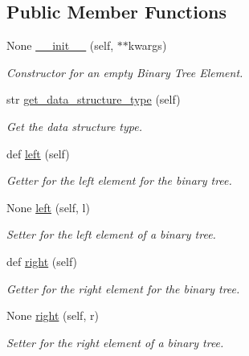 \subsection*{Public Member Functions}
\begin{DoxyCompactItemize}
\item 
None \mbox{\hyperlink{classbridges_1_1bin__tree__element_1_1_bin_tree_element_a4c50812c9a43aa5cd75ccc46b818a8b2}{\+\_\+\+\_\+init\+\_\+\+\_\+}} (self, $\ast$$\ast$kwargs)
\begin{DoxyCompactList}\small\item\em Constructor for an empty Binary Tree Element. \end{DoxyCompactList}\item 
str \mbox{\hyperlink{classbridges_1_1bin__tree__element_1_1_bin_tree_element_a9238744e18486fb8882238394f5efe7c}{get\+\_\+data\+\_\+structure\+\_\+type}} (self)
\begin{DoxyCompactList}\small\item\em Get the data structure type. \end{DoxyCompactList}\item 
def \mbox{\hyperlink{classbridges_1_1bin__tree__element_1_1_bin_tree_element_adb99f8052ef772be4c280970e47e6e0d}{left}} (self)
\begin{DoxyCompactList}\small\item\em Getter for the left element for the binary tree. \end{DoxyCompactList}\item 
None \mbox{\hyperlink{classbridges_1_1bin__tree__element_1_1_bin_tree_element_a29dc5b117c65774e756b46de45cd2f20}{left}} (self, l)
\begin{DoxyCompactList}\small\item\em Setter for the left element of a binary tree. \end{DoxyCompactList}\item 
def \mbox{\hyperlink{classbridges_1_1bin__tree__element_1_1_bin_tree_element_adb7eaa3c67233aa5c368e8907043f451}{right}} (self)
\begin{DoxyCompactList}\small\item\em Getter for the right element for the binary tree. \end{DoxyCompactList}\item 
None \mbox{\hyperlink{classbridges_1_1bin__tree__element_1_1_bin_tree_element_a01951f6db20fcc298311ebc1562a4da7}{right}} (self, r)
\begin{DoxyCompactList}\small\item\em Setter for the right element of a binary tree. \end{DoxyCompactList}\end{DoxyCompactItemize}
